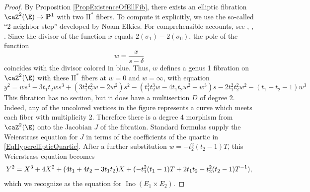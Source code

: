 \documentclass{article}
\def\P{\mathbf{P}}
\newcommand{\Ino}{\operatorname{{Ino}}}
\newcommand{\II}{\mathrm{II}}
\begin{document}
\begin{proof}
By Proposition \ref{PropExistenceOfEllFib}, there exists an elliptic fibration $\caZ^2(\E)\to \P^1$ with two $\II^\ast$ fibers.  
To compute it explicitly, we use the so-called ``$2$-neighbor step'' developed by Noam Elkies.  For comprehensible accounts, see \cite{Kumar:2014}, \cite{Sengupta:2017}, \cite{Utsumi:2012}. 
Since the divisor of the function $x$ equals $2(\sigma_{1})-2(\sigma_{0})$, the pole of the function
\[ %
 w = \frac{x}{s-\delta}
\]
coincides with the divisor colored in blue. Thus, $w$
defines a genus 1 fibration on $\caZ^2(\E)$ with these $\II^\ast$ fibers at $w=0$ and $w=\infty$, with equation
\begin{equation}
\label{EqHyperellipticQuartic}
y^{2}=w s^4 - 3 t_{1}t_{2} w s^3 + (3 t_{1}^2 t_{2}^2 w - 2 w^{2}) s^2 
- (t_{1}^3 t_{2}^3 w - 4 t_{1} t_{2} w^{2} - w^3) s 
-  2 t_{1}^2 t_{2}^2 w^2 - (t_{1} + t_{2} - 1) w^{3}
\end{equation}
This fibration has no section, but it does have a multisection $D$ of degree 2.  Indeed, any of the uncolored vertices in the figure represents a curve which meets each fiber with multiplicity 2.   Therefore there is a degree 4 morphism from $\caZ^2(\E)$ onto the Jacobian $J$ of the fibration.   Standard formulas supply the Weierstrass equation for $J$ in terms of the coefficients of the quartic in \eqref{EqHyperellipticQuartic}.  After a further substitution $w=-t_2^2(t_2-1) T$, this Weierstrass equation becomes
\begin{equation}
\label{EqInoOfIII}
Y^2=X^3+4X^2+(4t_1+4t_2-3t_1t_2)X \\
+(-t_1^2(t_1-1)T+2t_1t_2-t_2^2(t_2-1)T^{-1}),
\end{equation}
which we recognize as the equation for $\Ino(E_1\times E_2)$.  
\end{proof}
\end{document}
